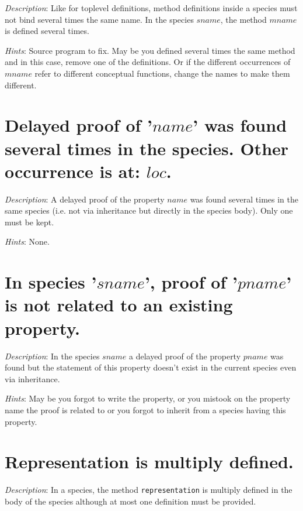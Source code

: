 {\em Description}: Like for toplevel definitions, method definitions
inside a species must not bind several times the same name. In the
species $sname$, the method $mname$ is defined several times.

{\em Hints}: Source program to fix. May be you defined several times
the same method and in this case, remove one of the definitions. Or if
the different occurrences of $mname$ refer to different conceptual
functions, change the names to make them different.



\section*{Delayed proof  of '$name$' was found several times in the
  species. Other occurrence is at: $loc$.}

{\em Description}: A delayed proof of the property $name$ was found
several times in the same species (i.e. not via inheritance but
directly in the species body). Only one must be kept.


{\em Hints}: None.



\section*{In species '$sname$', proof of '$pname$' is not related to
  an existing property.}

{\em Description}: In the species $sname$ a delayed proof of the
property $pname$ was found but the statement of this property doesn't
exist in the current species even via inheritance.


{\em Hints}: May be you forgot to write the property, or you mistook
on the property name the proof is related to or you forgot to inherit
from a species having this property.



\section*{Representation is multiply defined.}

{\em Description}: In a species, the method {\tt representation} is
multiply defined in the body of the species although at most one
definition must be provided.

